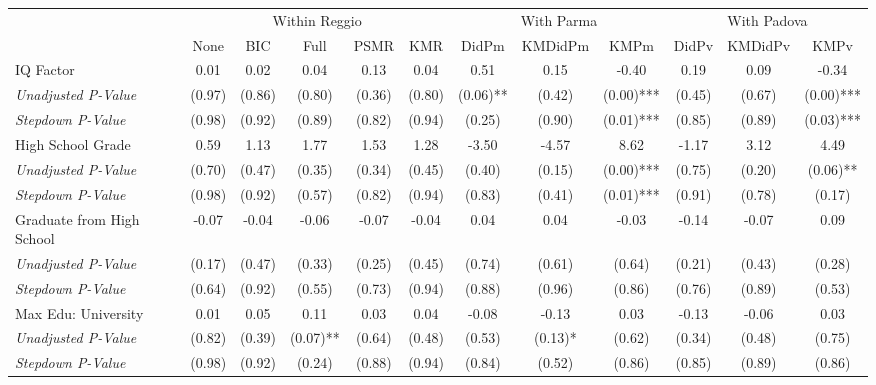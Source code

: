 \begin{tabular}{l c c c c c c c c c c c}
\toprule
& \multicolumn{5}{c}{Within Reggio} & \multicolumn{3}{c}{With Parma} & \multicolumn{3}{c}{With Padova} \\\cmidrule(lr){2-6} \cmidrule(lr){7-9} \cmidrule(lr){10-12}
 & None & BIC & Full & PSMR & KMR & DidPm & KMDidPm & KMPm & DidPv & KMDidPv & KMPv \\
\midrule
IQ Factor & 0.01 & 0.02 & 0.04 & 0.13 & 0.04 & 0.51 & 0.15 & -0.40 & 0.19 & 0.09 & -0.34 \\
\quad \textit{Unadjusted P-Value} & (0.97) & (0.86) & (0.80) & (0.36) & (0.80) & (0.06)** & (0.42) & (0.00)*** & (0.45) & (0.67) & (0.00)*** \\
\quad \textit{Stepdown P-Value} & (0.98) & (0.92) & (0.89) & (0.82) & (0.94) & (0.25) & (0.90) & (0.01)*** & (0.85) & (0.89) & (0.03)*** \\
High School Grade & 0.59 & 1.13 & 1.77 & 1.53 & 1.28 & -3.50 & -4.57 & 8.62 & -1.17 & 3.12 & 4.49 \\
\quad \textit{Unadjusted P-Value} & (0.70) & (0.47) & (0.35) & (0.34) & (0.45) & (0.40) & (0.15) & (0.00)*** & (0.75) & (0.20) & (0.06)** \\
\quad \textit{Stepdown P-Value} & (0.98) & (0.92) & (0.57) & (0.82) & (0.94) & (0.83) & (0.41) & (0.01)*** & (0.91) & (0.78) & (0.17) \\
Graduate from High School & -0.07 & -0.04 & -0.06 & -0.07 & -0.04 & 0.04 & 0.04 & -0.03 & -0.14 & -0.07 & 0.09 \\
\quad \textit{Unadjusted P-Value} & (0.17) & (0.47) & (0.33) & (0.25) & (0.45) & (0.74) & (0.61) & (0.64) & (0.21) & (0.43) & (0.28) \\
\quad \textit{Stepdown P-Value} & (0.64) & (0.92) & (0.55) & (0.73) & (0.94) & (0.88) & (0.96) & (0.86) & (0.76) & (0.89) & (0.53) \\
Max Edu: University & 0.01 & 0.05 & 0.11 & 0.03 & 0.04 & -0.08 & -0.13 & 0.03 & -0.13 & -0.06 & 0.03 \\
\quad \textit{Unadjusted P-Value} & (0.82) & (0.39) & (0.07)** & (0.64) & (0.48) & (0.53) & (0.13)* & (0.62) & (0.34) & (0.48) & (0.75) \\
\quad \textit{Stepdown P-Value} & (0.98) & (0.92) & (0.24) & (0.88) & (0.94) & (0.84) & (0.52) & (0.86) & (0.85) & (0.89) & (0.86) \\
\bottomrule
\end{tabular}
